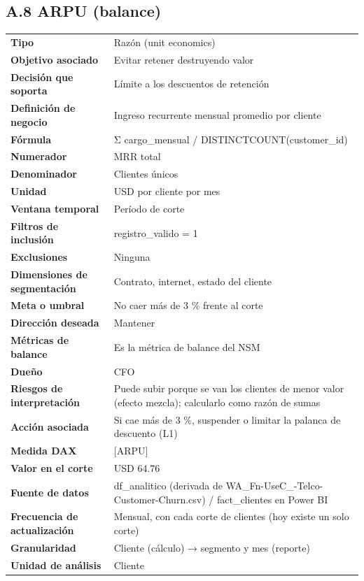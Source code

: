 \subsection*{A.8 ARPU (balance)}
\begin{footnotesize}
\begin{longtable}{@{}p{}p{}@{}}
\toprule
\textbf{Tipo} & Razón (unit economics) \\
\textbf{Objetivo asociado} & Evitar retener destruyendo valor \\
\textbf{Decisión que soporta} & Límite a los descuentos de retención \\
\textbf{Definición de negocio} & Ingreso recurrente mensual promedio por cliente \\
\textbf{Fórmula} & Σ cargo\_mensual / DISTINCTCOUNT(customer\_id) \\
\textbf{Numerador} & MRR total \\
\textbf{Denominador} & Clientes únicos \\
\textbf{Unidad} & USD por cliente por mes \\
\textbf{Ventana temporal} & Período de corte \\
\textbf{Filtros de inclusión} & registro\_valido = 1 \\
\textbf{Exclusiones} & Ninguna \\
\textbf{Dimensiones de segmentación} & Contrato, internet, estado del cliente \\
\textbf{Meta o umbral} & No caer más de 3 \% frente al corte \\
\textbf{Dirección deseada} & Mantener \\
\textbf{Métricas de balance} & Es la métrica de balance del NSM \\
\textbf{Dueño} & CFO \\
\textbf{Riesgos de interpretación} & Puede subir porque se van los clientes de menor valor (efecto mezcla); calcularlo como razón de sumas \\
\textbf{Acción asociada} & Si cae más de 3 \%, suspender o limitar la palanca de descuento (L1) \\
\textbf{Medida DAX} & [ARPU] \\
\textbf{Valor en el corte} & USD 64.76 \\
\textbf{Fuente de datos} & df\_analitico (derivada de WA\_Fn-UseC\_-Telco-Customer-Churn.csv) / fact\_clientes en Power BI \\
\textbf{Frecuencia de actualización} & Mensual, con cada corte de clientes (hoy existe un solo corte) \\
\textbf{Granularidad} & Cliente (cálculo) → segmento y mes (reporte) \\
\textbf{Unidad de análisis} & Cliente \\
\bottomrule
\end{longtable}
\end{footnotesize}

